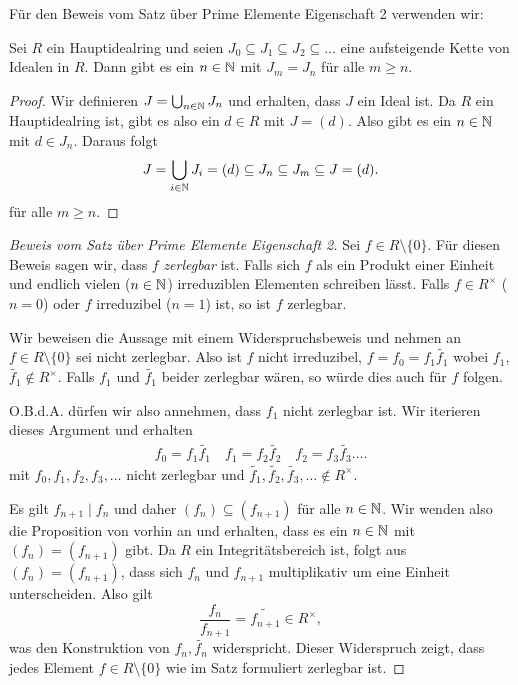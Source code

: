 Für den Beweis vom Satz über Prime Elemente Eigenschaft 2 verwenden wir:
\begin{proposition}
	Sei $R$ ein Hauptidealring und seien $J_0 \subseteq J_1 \subseteq J_2 \subseteq \ldots$ eine aufsteigende Kette von Idealen in $R$.
	Dann gibt es ein $n \in \mathbb{N}$ mit $J_{m} = J_{n}$ für alle $m \geq n$.
\end{proposition}

\begin{proof}
	Wir definieren $J = \bigcup_{n \in \mathbb{N}} J_{n}$ und erhalten, dass $J$ ein Ideal ist.
	Da $R$ ein Hauptidealring ist, gibt es also ein $d \in R$ mit $J = (d)$.
	Also gibt es ein $n \in \mathbb{N}$ mit $d \in J_{n}$. Daraus folgt 
	\[
		J = \bigcup_{i \in \mathbb{N}} J_{i} = (d) \subseteq J_{n} \subseteq J_{m} \subseteq J = (d)
	.\] 
	für alle $m \geq n$.

\end{proof}

\begin{proof}[Beweis vom Satz über Prime Elemente Eigenschaft 2]
	Sei $f \in R \setminus \{0\} $. Für diesen Beweis sagen wir, dass $f$ \emph{zerlegbar} ist.
	Falls sich $f$ als ein Produkt einer Einheit und endlich vielen ($n \in \mathbb{N}$) irreduziblen Elementen schreiben lässt.
	Falls $f \in R^{\times}$ ($n = 0$) oder $f$ irreduzibel ($n = 1$) ist, so ist $f$ zerlegbar.

	Wir beweisen die Aussage mit einem Widerspruchsbeweis und nehmen an $f \in R \setminus \{0\} $ sei nicht zerlegbar.
	Also ist $f$ nicht irreduzibel, $f = f_0 = f_1 \widetilde{f_1}$ wobei $f_1$, $\widetilde{f_1} \not\in R^{\times}$.
	Falls $f_1$ und $\widetilde{f_1}$ beider zerlegbar wären, so würde dies auch für $f$ folgen.

	O.B.d.A. dürfen wir also annehmen, dass $f_1$ nicht zerlegbar ist.
	Wir iterieren dieses Argument und erhalten
	\begin{align*}
		f_0 = f_1 \widetilde{f_1} \quad f_1 = f_2 \widetilde{f_2} \quad f_2 = f_3 \widetilde{f_3} \ldots
	.\end{align*}
	mit $f_0, f_1,f_2,f_3,\ldots$ nicht zerlegbar und $\widetilde{f_1}, \widetilde{f_2}, \widetilde{f_3},\ldots \not\in  R^{\times}$.

	Es gilt $f_{n+1} \mid f_{n}$ und daher $(f_{n}) \subseteq (f_{n+1})$ für alle $n \in \mathbb{N}$.
	Wir wenden also die Proposition von vorhin an und erhalten, dass es ein $n \in \mathbb{N}$ mit $(f_{n}) = (f_{n+1})$ gibt.
	Da $R$ ein Integritätsbereich ist, folgt aus $(f_{n}) = (f_{n+1})$, dass sich $f_{n}$ und $f_{n+1}$ multiplikativ um eine Einheit unterscheiden.
	Also gilt 
	\[
	\frac{f_{n}}{f_{n+1}} = \widetilde{f_{n+1}} \in R^{\times}
	,\] 
	was den Konstruktion von $f_{n}, \widetilde{f_{n}}$ widerspricht.
	Dieser Widerspruch zeigt, dass jedes Element $f \in R \setminus \{0\} $ wie im Satz formuliert zerlegbar ist.
\end{proof}

